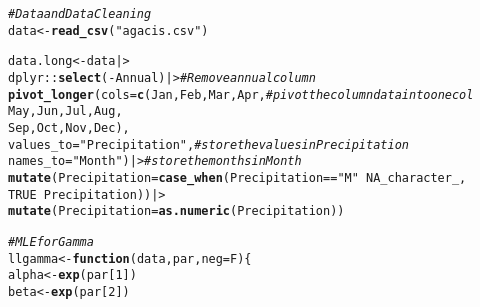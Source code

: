 \documentclass{article}\usepackage[]{graphicx}\usepackage[]{xcolor}
\makeatletter
\newcommand{\hlnum}[1]{\textcolor[rgb]{0.686,0.059,0.569}{#1}}%
\newcommand{\hlsng}[1]{\textcolor[rgb]{0.192,0.494,0.8}{#1}}%
\newcommand{\hlcom}[1]{\textcolor[rgb]{0.678,0.584,0.686}{\textit{#1}}}%
\newcommand{\hlopt}[1]{\textcolor[rgb]{0,0,0}{#1}}%
\newcommand{\hldef}[1]{\textcolor[rgb]{0.345,0.345,0.345}{#1}}%
\newcommand{\hlkwa}[1]{\textcolor[rgb]{0.161,0.373,0.58}{\textbf{#1}}}%
\newcommand{\hlkwb}[1]{\textcolor[rgb]{0.69,0.353,0.396}{#1}}%
\newcommand{\hlkwc}[1]{\textcolor[rgb]{0.333,0.667,0.333}{#1}}%
\newcommand{\hlkwd}[1]{\textcolor[rgb]{0.737,0.353,0.396}{\textbf{#1}}}%
\newenvironment{kframe}{%
 \def\at@end@of@kframe{}%
 \ifinner\ifhmode%
  \def\at@end@of@kframe{\end{minipage}}%
  \begin{minipage}{\columnwidth}%
 \fi\fi%
 \def\FrameCommand##1{\hskip\@totalleftmargin \hskip-\fboxsep
 \colorbox{shadecolor}{##1}\hskip-\fboxsep
     \hskip-\linewidth \hskip-\@totalleftmargin \hskip\columnwidth}%
 \MakeFramed {\advance\hsize-\width
   \@totalleftmargin\z@ \linewidth\hsize
   \@setminipage}}%
 {\par\unskip\endMakeFramed%
 \at@end@of@kframe}
\newenvironment{knitrout}{}{} %
\makeatother
\begin{document}
\begin{enumerate}
\begin{enumerate}
\begin{knitrout}
\color{fgcolor}\begin{kframe}
\begin{alltt}
\hlcom{#Data and Data Cleaning}
\hldef{data} \hlkwb{<-} \hlkwd{read_csv}\hldef{(}\hlsng{"agacis.csv"}\hldef{)}
\end{alltt}


{\ttfamily\noindent\itshape{}}\begin{alltt}
\hldef{data.long} \hlkwb{<-} \hldef{data |>}
  \hldef{dplyr}\hlopt{::}\hlkwd{select}\hldef{(}\hlopt{-}\hldef{Annual) |>}                   \hlcom{# Remove annual column }
  \hlkwd{pivot_longer}\hldef{(}\hlkwc{cols} \hldef{=} \hlkwd{c}\hldef{(Jan, Feb, Mar, Apr,}   \hlcom{# pivot the column data into one col}
                        \hldef{May, Jun, Jul, Aug,}
                        \hldef{Sep, Oct, Nov, Dec),}
               \hlkwc{values_to} \hldef{=} \hlsng{"Precipitation"}\hldef{,}   \hlcom{# store the values in Precipitation}
               \hlkwc{names_to} \hldef{=} \hlsng{"Month"}\hldef{) |>}         \hlcom{# store the months in Month}
  \hlkwd{mutate}\hldef{(}\hlkwc{Precipitation} \hldef{=} \hlkwd{case_when}\hldef{(Precipitation} \hlopt{==} \hlsng{"M"} \hlopt{~} \hlnum{NA_character_}\hldef{,}
                                   \hlnum{TRUE}                 \hlopt{~} \hldef{Precipitation))|>}
  \hlkwd{mutate}\hldef{(}\hlkwc{Precipitation} \hldef{=} \hlkwd{as.numeric}\hldef{(Precipitation))}

\hlcom{#MLE for Gamma}
\hldef{llgamma} \hlkwb{<-} \hlkwa{function}\hldef{(}\hlkwc{data}\hldef{,} \hlkwc{par}\hldef{,} \hlkwc{neg}\hldef{=F)\{}
  \hldef{alpha} \hlkwb{<-} \hlkwd{exp}\hldef{(par[}\hlnum{1}\hldef{])}
  \hldef{beta} \hlkwb{<-} \hlkwd{exp}\hldef{(par[}\hlnum{2}\hldef{])}


\end{alltt}
\end{kframe}
\end{knitrout}
\end{enumerate}
\end{enumerate}
\end{document}
